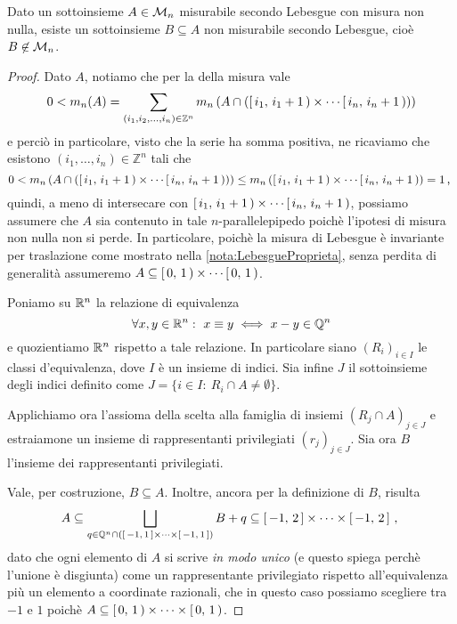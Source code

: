 \begin{theorem}\label{thm:InsiemeVitali}
	Dato un sottoinsieme $A\in\mathcal M_n$ misurabile secondo Lebesgue con misura non nulla, esiste un sottoinsieme $B\subseteq A$ non misurabile secondo Lebesgue, cioè $B\not\in\mathcal M_n$.
\end{theorem}
\begin{proof}
	Dato $A$, notiamo che per la \sigadd[ità] della misura vale
	\begin{equation*}
		0<m_n(A)=\sum_{(i_1,i_2,\dots,i_n)\in\mathbb Z^n} m_n\left(A\cap\left(\left[\,i_1,\,i_1+1\,\right)\times\cdots\left[\,i_n,\,i_n+1\,\right)\right)\right)
	\end{equation*}
	e perciò in particolare, visto che la serie ha somma positiva, ne ricaviamo che esistono $(i_1,\dots,i_n)\in \mathbb Z^n$ tali che
	\begin{equation*}
		0<m_n\left(A\cap\left(\left[\,i_1,\,i_1+1\,\right)\times\cdots\left[\,i_n,\,i_n+1\,\right)\right)\right)\le
		m_n\left(\left[\,i_1,\,i_1+1\,\right)\times\cdots\left[\,i_n,\,i_n+1\,\right)\right)=1 \, \text{, }
	\end{equation*}
	quindi, a meno di intersecare con $\left[\,i_1,\,i_1+1\,\right)\times\cdots\left[\,i_n,\,i_n+1\,\right)$, possiamo assumere che $A$ sia contenuto in tale $n$-parallelepipedo poichè l'ipotesi di misura non nulla non si perde. 
	In particolare, poichè la misura di Lebesgue è invariante per traslazione come mostrato nella \cref{nota:LebesgueProprieta}, senza perdita di generalità assumeremo $A\subseteq \left[\,0,\,1\,\right)\times\cdots\left[\,0,\,1\,\right)$.
	
	Poniamo su $\mathbb R^n$ la relazione di equivalenza 
	\begin{equation*}
		\forall x,y\in\mathbb R^n:\ x\equiv y\iff x-y\in\mathbb Q^n
	\end{equation*}
	e quozientiamo $\mathbb R^n$ rispetto a tale relazione. In particolare siano $(R_i)_{i\in I}$ le classi d'equivalenza, dove $I$ è un insieme di indici. Sia infine $J$ il sottoinsieme degli indici definito come $J=\{i\in I:\ R_i\cap A\not =\emptyset\}$. 

	Applichiamo ora l'assioma della scelta alla famiglia di insiemi $(R_j\cap A)_{j\in J}$ e estraiamone un insieme di rappresentanti privilegiati $(r_j)_{j\in J}$. Sia ora $B$ l'insieme dei rappresentanti privilegiati.
	
	Vale, per costruzione, $B\subseteq A$. 
	Inoltre, ancora per la definizione di $B$, risulta
	\begin{equation}\label{eq:ContenimentiVitali}
		A\subseteq\bigsqcup_{q\in\mathbb Q^n\cap\left(\left[\,-1,\,1\,\right]\times\cdots \times\left[\,-1,\,1\,\right]\right)} B+q\subseteq \left[\,-1,\,2\,\right]\times\cdots\times\left[\,-1,\,2\,\right]\, \text{, }
	\end{equation}
	dato che ogni elemento di $A$ si scrive \emph{in modo unico} (e questo spiega perchè l'unione è disgiunta) come un rappresentante privilegiato rispetto all'equivalenza più un elemento a coordinate razionali, che in questo caso possiamo scegliere tra $-1$ e $1$ poichè $A\subseteq \left[\,0,\,1\,\right)\times\cdots \times\left[\,0,\,1\,\right)$.
	

\end{proof}
